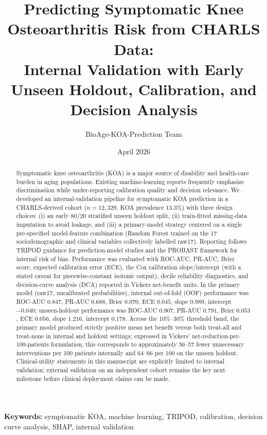 \documentclass[11pt,a4paper]{article}
\title{Predicting Symptomatic Knee Osteoarthritis Risk from CHARLS Data:\\
\large Internal Validation with Early Unseen Holdout, Calibration, and Decision Analysis}
\author{BioAge-KOA-Prediction Team}
\date{April 2026}
\begin{document}
\maketitle

\begin{abstract}
Symptomatic knee osteoarthritis (KOA) is a major source of disability and health-care burden in aging populations. Existing machine-learning reports frequently emphasize discrimination while under-reporting calibration quality and decision relevance. We developed an internal-validation pipeline for symptomatic KOA prediction in a CHARLS-derived cohort ($n=12{,}329$, KOA prevalence $13.3\%$) with three design choices: (i) an early 80/20 stratified unseen holdout split, (ii) train-fitted missing-data imputation to avoid leakage, and (iii) a primary-model strategy centered on a single pre-specified model-feature combination (Random Forest trained on the 17 sociodemographic and clinical variables collectively labelled raw17). Reporting follows TRIPOD guidance for prediction-model studies and the PROBAST framework for internal risk of bias. Performance was evaluated with ROC-AUC, PR-AUC, Brier score, expected calibration error (ECE), the Cox calibration slope/intercept (with a stated caveat for piecewise-constant isotonic output), decile reliability diagnostics, and decision-curve analysis (DCA) reported in Vickers net-benefit units. In the primary model (raw17, uncalibrated probabilities), internal out-of-fold (OOF) performance was ROC-AUC $0.847$, PR-AUC $0.688$, Brier $0.070$, ECE $0.045$, slope $0.989$, intercept $-0.040$; unseen-holdout performance was ROC-AUC $0.907$, PR-AUC $0.791$, Brier $0.053$, ECE $0.056$, slope $1.216$, intercept $0.178$. Across the 10\%--30\% threshold band, the primary model produced strictly positive mean net benefit versus both treat-all and treat-none in internal and holdout settings; expressed in Vickers' net-reduction-per-100-patients formulation, this corresponds to approximately 56--57 fewer unnecessary interventions per 100 patients internally and 64--66 per 100 on the unseen holdout. Clinical-utility statements in this manuscript are explicitly limited to internal validation; external validation on an independent cohort remains the key next milestone before clinical deployment claims can be made.
\end{abstract}

\textbf{Keywords:} symptomatic KOA, machine learning, TRIPOD, calibration, decision curve analysis, SHAP, internal validation
\end{document}
